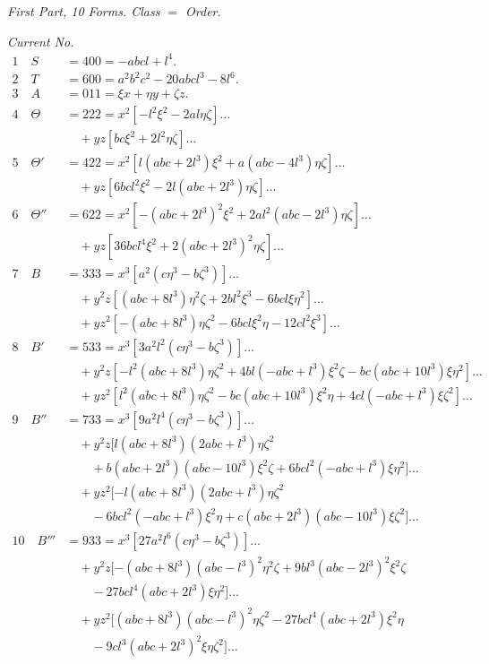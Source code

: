\documentclass[11pt,a4paper]{article}
\begin{document}
\bigskip

\noindent
\textit{First Part, 10 Forms. Class $=$ Order.}\par\medskip
\noindent\textit{Current No.}
\begin{align*}
  1\quad S &= 400 = -abcl+l^{4}.\\[2pt]
  2\quad T &= 600 = a^{2}b^{2}c^{2}-20abcl^{3}-8l^{6}.\\[2pt]
  3\quad A &= 011 = \xi x+\eta y+\zeta z.\\[2pt]
  4\quad \Theta &= 222 = x^{2}[-l^{2}\xi^{2}-2al\eta\zeta]\ldots\\
   &\quad +yz[bc\xi^{2}+2l^{2}\eta\zeta]\ldots\\[2pt]
  5\quad \Theta' &= 422 = x^{2}[l(abc+2l^{3})\xi^{2}+a(abc-4l^{3})\eta\zeta]\ldots\\
   &\quad +yz[6bcl^{2}\xi^{2}-2l(abc+2l^{3})\eta\zeta]\ldots\\[2pt]
  6\quad \Theta'' &= 622 = x^{2}[-(abc+2l^{3})^{2}\xi^{2}+2al^{2}(abc-2l^{3})\eta\zeta]\ldots\\
   &\quad +yz[36bcl^{4}\xi^{2}+2(abc+2l^{3})^{2}\eta\zeta]\ldots\\[2pt]
  7\quad B &= 333 = x^{3}[a^{2}(c\eta^{3}-b\zeta^{3})]\ldots\\
   &\quad +y^{2}z[(abc+8l^{3})\eta^{2}\zeta+2bl^{2}\xi^{3}-6bcl\xi\eta^{2}]\ldots\\
   &\quad +yz^{2}[-(abc+8l^{3})\eta\zeta^{2}-6bcl\xi^{2}\eta-12cl^{2}\xi^{3}]\ldots\\[2pt]
  8\quad B' &= 533 = x^{3}[3a^{2}l^{2}(c\eta^{3}-b\zeta^{3})]\ldots\\
   &\quad +y^{2}z[-l^{2}(abc+8l^{3})\eta\zeta^{2}+4bl(-abc+l^{3})\xi^{2}\zeta-bc(abc+10l^{3})\xi\eta^{2}]\ldots\\
   &\quad +yz^{2}[l^{2}(abc+8l^{3})\eta\zeta^{2}-bc(abc+10l^{3})\xi^{2}\eta+4cl(-abc+l^{3})\xi\zeta^{2}]\ldots\\[2pt]
  9\quad B'' &= 733 = x^{3}[9a^{2}l^{4}(c\eta^{3}-b\zeta^{3})]\ldots\\
   &\quad +y^{2}z[l(abc+8l^{3})(2abc+l^{3})\eta\zeta^{2}\\
   &\qquad +b(abc+2l^{3})(abc-10l^{3})\xi^{2}\zeta+6bcl^{2}(-abc+l^{3})\xi\eta^{2}]\ldots\\
   &\quad +yz^{2}[-l(abc+8l^{3})(2abc+l^{3})\eta\zeta^{2}\\
   &\qquad -6bcl^{2}(-abc+l^{3})\xi^{2}\eta+c(abc+2l^{3})(abc-10l^{3})\xi\zeta^{2}]\ldots\\[2pt]
  10\quad B''' &= 933 = x^{3}[27a^{2}l^{6}(c\eta^{3}-b\zeta^{3})]\ldots\\
   &\quad +y^{2}z[-(abc+8l^{3})(abc-l^{3})^{2}\eta^{2}\zeta+9bl^{3}(abc-2l^{3})^{2}\xi^{2}\zeta\\
   &\qquad -27bcl^{4}(abc+2l^{3})\xi\eta^{2}]\ldots\\
   &\quad +yz^{2}[(abc+8l^{3})(abc-l^{3})^{2}\eta\zeta^{2}-27bcl^{4}(abc+2l^{3})\xi^{2}\eta\\
   &\qquad -9cl^{3}(abc+2l^{3})^{2}\xi\eta\zeta^{2}]\ldots
\end{align*}
\end{document}
